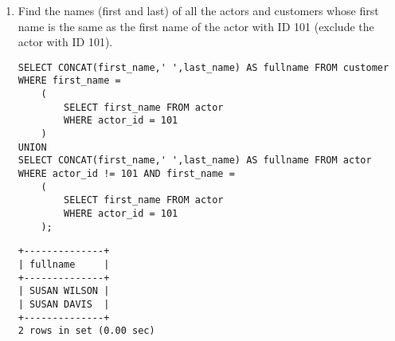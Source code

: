 \documentclass[]{article}
\begin{document}
\begin{enumerate}
\item Find the names (first and last) of all the actors and customers whose first name is the same as the first name of the actor with ID 101 (exclude the actor with ID 101).
\begin{verbatim}
SELECT CONCAT(first_name,' ',last_name) AS fullname FROM customer
WHERE first_name =
	(
		SELECT first_name FROM actor
		WHERE actor_id = 101
	)
UNION
SELECT CONCAT(first_name,' ',last_name) AS fullname FROM actor
WHERE actor_id != 101 AND first_name =
	(
		SELECT first_name FROM actor
		WHERE actor_id = 101
	);
\end{verbatim}
\begin{verbatim}
+--------------+
| fullname     |
+--------------+
| SUSAN WILSON |
| SUSAN DAVIS  |
+--------------+
2 rows in set (0.00 sec)
\end{verbatim}

\end{enumerate}
\end{document}
